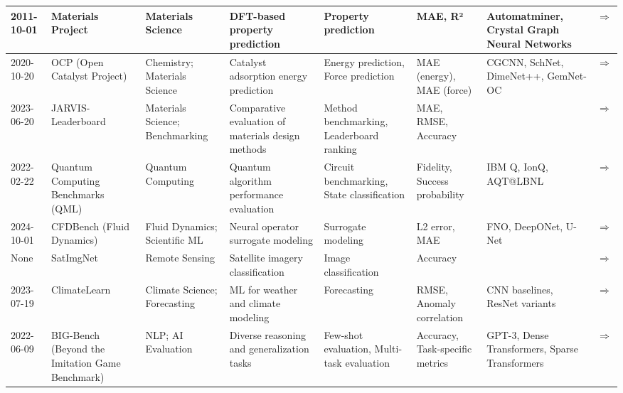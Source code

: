 \documentclass{article}
\begin{document}
\begin{landscape}
{\begin{longtable}{|p{1.5cm}|p{2.5cm}|p{2cm}|p{2cm}|p{3cm}|p{2cm}|p{2cm}|p{1cm}|}
2011-10-01 & Materials Project & Materials Science & DFT-based property prediction & Property prediction & MAE, R² & Automatminer, Crystal Graph Neural Networks & \cite{jain2013materials} \href{https://materialsproject.org/}{$\Rightarrow$ } \\ \hline
2020-10-20 & OCP (Open Catalyst Project) & Chemistry; Materials Science & Catalyst adsorption energy prediction & Energy prediction, Force prediction & MAE (energy), MAE (force) & CGCNN, SchNet, DimeNet++, GemNet-OC & \cite{chanussot2021oc20, tran2023oc22, doi:10.1021/acscatal.0c04525, tran2023b} \href{https://pubs.acs.org/doi/10.1021/acscatal.0c04525}{$\Rightarrow$ } \\ \hline
2023-06-20 & JARVIS-Leaderboard & Materials Science; Benchmarking & Comparative evaluation of materials design methods & Method benchmarking, Leaderboard ranking & MAE, RMSE, Accuracy &  & \cite{choudhary2024jarvis} \href{https://doi.org/10.1038/s41524-024-01259-w}{$\Rightarrow$ } \\ \hline
2022-02-22 & Quantum Computing Benchmarks (QML) & Quantum Computing & Quantum algorithm performance evaluation & Circuit benchmarking, State classification & Fidelity, Success probability & IBM Q, IonQ, AQT@LBNL & \cite{kiwit2023} \href{http://dx.doi.org/10.1109/QCE57702.2023.00061}{$\Rightarrow$ } \\ \hline
2024-10-01 & CFDBench (Fluid Dynamics) & Fluid Dynamics; Scientific ML & Neural operator surrogate modeling & Surrogate modeling & L2 error, MAE & FNO, DeepONet, U-Net & \cite{luo2024cfdbenchlargescalebenchmarkmachine} \href{https://arxiv.org/abs/2310.05963}{$\Rightarrow$ } \\ \hline
None & SatImgNet & Remote Sensing & Satellite imagery classification & Image classification & Accuracy &  & \cite{roberts2023satinmultitaskmetadatasetclassifying} \href{https://arxiv.org/abs/2304.11619}{$\Rightarrow$ } \\ \hline
2023-07-19 & ClimateLearn & Climate Science; Forecasting & ML for weather and climate modeling & Forecasting & RMSE, Anomaly correlation & CNN baselines, ResNet variants & \cite{nguyen2023climatelearnbenchmarkingmachinelearning} \href{https://arxiv.org/abs/2307.01909}{$\Rightarrow$ } \\ \hline
2022-06-09 & BIG-Bench (Beyond the Imitation Game Benchmark) & NLP; AI Evaluation & Diverse reasoning and generalization tasks & Few-shot evaluation, Multi-task evaluation & Accuracy, Task-specific metrics & GPT-3, Dense Transformers, Sparse Transformers & \cite{srivastava2023imitationgamequantifyingextrapolating} \href{https://arxiv.org/abs/2206.04615}{$\Rightarrow$ } \\ \hline

\end{longtable}}
\end{landscape}
\end{document}
